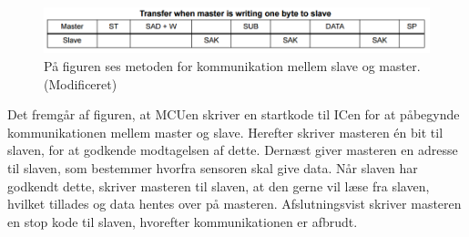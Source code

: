 \begin{figure}[H]
	\centering
	\includegraphics[scale=0.75]{figures/cDesign/Sensor_write_read2.png}
	\caption{På figuren ses metoden for kommunikation mellem slave og master. \citep{STMicroelectronics2016} (Modificeret)}
	\label{Fig:master_slave}
\end{figure}

Det fremgår af figuren, at MCUen skriver en startkode til ICen for at påbegynde kommunikationen mellem master og slave. Herefter skriver masteren én bit til slaven, for at godkende modtagelsen af dette. Dernæst giver masteren en adresse til slaven, som bestemmer hvorfra sensoren skal give data. Når slaven har godkendt dette, skriver masteren til slaven, at den gerne vil læse fra slaven, hvilket tillades og data hentes over på masteren. Afslutningsvist skriver masteren en stop kode til slaven, hvorefter kommunikationen er afbrudt. %

